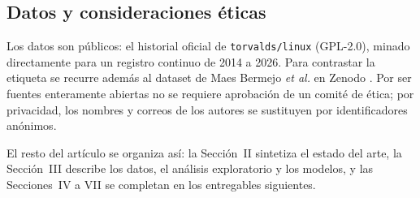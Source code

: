 \subsection{Datos y consideraciones éticas}
Los datos son públicos: el historial oficial de \texttt{torvalds/linux} (GPL-2.0), minado directamente para un registro continuo de 2014 a 2026. Para contrastar la etiqueta se recurre además al dataset de Maes Bermejo \emph{et al.} en Zenodo \cite{MaesBermejo2024}. Por ser fuentes enteramente abiertas no se requiere aprobación de un comité de ética; por privacidad, los nombres y correos de los autores se sustituyen por identificadores anónimos.

El resto del artículo se organiza así: la Sección~II sintetiza el estado del arte, la Sección~III describe los datos, el análisis exploratorio y los modelos, y las Secciones~IV a VII se completan en los entregables siguientes.
